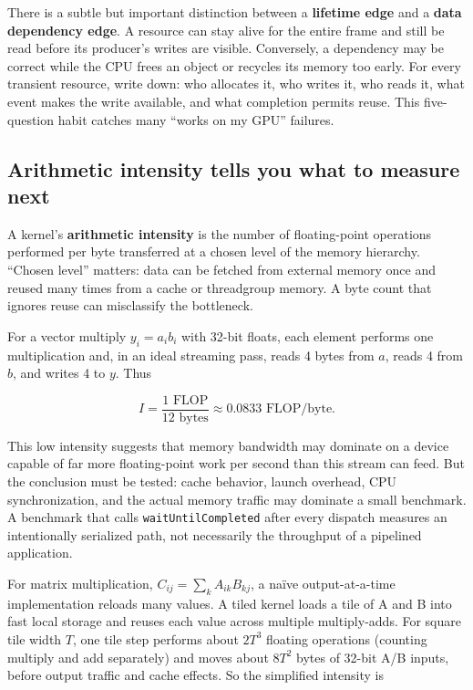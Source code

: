 There is a subtle but important distinction between a \textbf{lifetime edge} and a \textbf{data dependency edge}. A resource can stay alive for the entire frame and still be read before its producer's writes are visible. Conversely, a dependency may be correct while the CPU frees an object or recycles its memory too early. For every transient resource, write down: who allocates it, who writes it, who reads it, what event makes the write available, and what completion permits reuse. This five-question habit catches many ``works on my GPU'' failures.

\subsection{Arithmetic intensity tells you what to measure next}\label{arithmetic-intensity-tells-you-what-to-measure-next}

A kernel's \textbf{arithmetic intensity} is the number of floating-point operations performed per byte transferred at a chosen level of the memory hierarchy. ``Chosen level'' matters: data can be fetched from external memory once and reused many times from a cache or threadgroup memory. A byte count that ignores reuse can misclassify the bottleneck.

For a vector multiply \(y_i=a_i b_i\) with 32-bit floats, each element performs one multiplication and, in an ideal streaming pass, reads 4 bytes from \(a\), reads 4 from \(b\), and writes 4 to \(y\). Thus

\[
I=\frac{1\text{ FLOP}}{12\text{ bytes}}\approx0.0833\text{ FLOP/byte}.
\]

This low intensity suggests that memory bandwidth may dominate on a device capable of far more floating-point work per second than this stream can feed. But the conclusion must be tested: cache behavior, launch overhead, CPU synchronization, and the actual memory traffic may dominate a small benchmark. A benchmark that calls \texttt{waitUntilCompleted} after every dispatch measures an intentionally serialized path, not necessarily the throughput of a pipelined application.

For matrix multiplication, \(C_{ij}=\sum_k A_{ik}B_{kj}\), a naïve output-at-a-time implementation reloads many values. A tiled kernel loads a tile of A and B into fast local storage and reuses each value across multiple multiply-adds. For square tile width \(T\), one tile step performs about \(2T^3\) floating operations (counting multiply and add separately) and moves about \(8T^2\) bytes of 32-bit A/B inputs, before output traffic and cache effects. So the simplified intensity is

